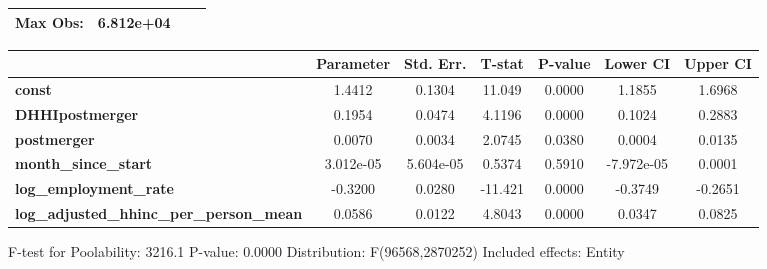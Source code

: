 \documentclass{report}
\begin{document}
\begin{center}
\begin{tabular}{lclc}
\textbf{Max Obs:}                                &      6.812e+04       & \textbf{                     }   &                  \\
\bottomrule
\end{tabular}
\begin{tabular}{lcccccc}
                                                 & \textbf{Parameter} & \textbf{Std. Err.} & \textbf{T-stat} & \textbf{P-value} & \textbf{Lower CI} & \textbf{Upper CI}  \\
\midrule
\textbf{const}                                   &       1.4412       &       0.1304       &      11.049     &      0.0000      &       1.1855      &       1.6968       \\
\textbf{DHHIpostmerger}                          &       0.1954       &       0.0474       &      4.1196     &      0.0000      &       0.1024      &       0.2883       \\
\textbf{postmerger}                              &       0.0070       &       0.0034       &      2.0745     &      0.0380      &       0.0004      &       0.0135       \\
\textbf{month\_since\_start}                     &     3.012e-05      &     5.604e-05      &      0.5374     &      0.5910      &     -7.972e-05    &       0.0001       \\
\textbf{log\_employment\_rate}                   &      -0.3200       &       0.0280       &     -11.421     &      0.0000      &      -0.3749      &      -0.2651       \\
\textbf{log\_adjusted\_hhinc\_per\_person\_mean} &       0.0586       &       0.0122       &      4.8043     &      0.0000      &       0.0347      &       0.0825       \\
\bottomrule
\end{tabular}
\end{center}

F-test for Poolability: 3216.1 \newline
 P-value: 0.0000 \newline
 Distribution: F(96568,2870252) \newline
  \newline
 Included effects: Entity
\end{document}
